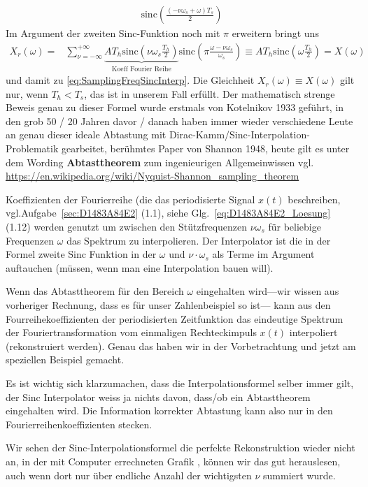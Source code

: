 \begin{Loesung}
\begin{align}
\mathrm{sinc}(\frac{(-\nu \omega_s + \omega) T_s}{2})
\end{align}
Im Argument der zweiten Sinc-Funktion noch mit $\pi$ erweitern bringt uns
\begin{align}
X_r(\omega)
=& \sum_{\nu=-\infty}^{+\infty} \underbrace{A T_h \mathrm{sinc}\left(\nu \omega_s \frac{T_h}{2}\right)}_{\text{Koeff Fourier Reihe}}
\mathrm{sinc}\left(\pi \frac{\omega -\nu \omega_s}{\omega_s}\right)
\equiv A T_h \mathrm{sinc}\left(\omega \frac{T_h}{2}\right) = X(\omega)
\end{align}
und damit zu \eqref{eq:SamplingFreqSincInterp}. Die Gleichheit $X_r(\omega)
\equiv X(\omega)$ gilt nur, wenn $T_h < T_s$, das ist in unserem Fall erfüllt.
Der mathematisch strenge Beweis genau zu dieser Formel wurde erstmals von Kotelnikov 1933 geführt,
in den grob 50 / 20 Jahren davor / danach haben immer wieder verschiedene Leute an genau dieser ideale Abtastung mit Dirac-Kamm/Sinc-Interpolation-Problematik
gearbeitet, berühmtes Paper von Shannon 1948, heute gilt es unter dem Wording \textbf{Abtasttheorem} zum ingenieurigen Allgemeinwissen vgl. \url{https://en.wikipedia.org/wiki/Nyquist-Shannon_sampling_theorem}

Koeffizienten der Fourierreihe (die das periodisierte Signal $x(t)$ beschreiben, vgl.Aufgabe~\ref{sec:D1483A84E2} (1.1), siehe Glg.~\eqref{eq:D1483A84E2_Loesung} (1.12)
werden genutzt um zwischen den Stützfrequenzen
$\nu \omega_s$ für beliebige Frequenzen $\omega$ das Spektrum zu interpolieren.
Der Interpolator ist die in der Formel zweite Sinc Funktion in der $\omega$ und
$\nu \cdot \omega_s$ als Terme im Argument auftauchen (müssen, wenn man eine Interpolation bauen will).

Wenn das Abtasttheorem für den Bereich $\omega$ eingehalten wird---wir wissen aus
vorheriger Rechnung, dass es für unser Zahlenbeispiel so ist---
kann aus den Fourreihekoeffizienten der periodisierten Zeitfunktion
das eindeutige Spektrum der Fouriertransformation vom einmaligen Rechteckimpuls $x(t)$
interpoliert (rekonstruiert werden). Genau das haben wir in der Vorbetrachtung und
jetzt am speziellen Beispiel gemacht.

Es ist wichtig sich klarzumachen, dass die Interpolationsformel selber immer gilt,
der Sinc Interpolator weiss ja nichts davon, dass/ob ein Abtasttheorem eingehalten wird.
Die Information korrekter Abtastung kann also nur in den Fourierreihenkoeffizienten stecken.

Wir sehen der Sinc-Interpolationsformel die perfekte Rekonstruktion wieder nicht an,
in der mit Computer errechneten Grafik ,
können wir das gut herauslesen, auch wenn dort nur über endliche Anzahl der
wichtigsten $\nu$ summiert wurde.


\end{Loesung}
